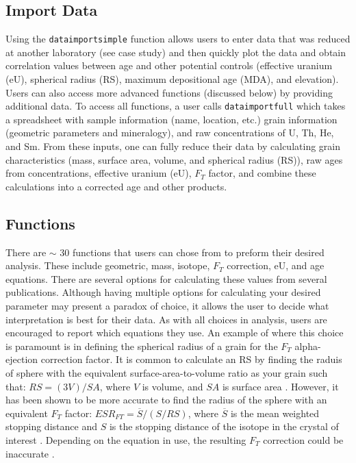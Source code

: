 \documentclass[12pt]{article}
\begin{document}
\subsection{Import Data}
Using the \texttt{dataimportsimple} function allows users to enter data that was reduced at another laboratory (see case study) and then quickly plot the data and obtain correlation values between age and other potential controls (effective uranium (eU), spherical radius (RS), maximum depositional age (MDA), and elevation). Users can also access more advanced functions (discussed below) by providing additional data. To access all functions, a user calls \texttt{dataimportfull} which takes a spreadsheet with sample information (name, location, etc.) grain information (geometric parameters and mineralogy), and raw concentrations of U, Th, He, and Sm. From these inputs, one can fully reduce their data by calculating grain characteristics (mass, surface area, volume, and spherical radius (RS)), raw ages from concentrations, effective uranium (eU), $F_T$ factor, and combine these calculations into a corrected age and other products. 

\subsection{Functions}
There are $\sim$ 30 functions that users can chose from to preform their desired analysis. These include geometric, mass, isotope, $F_T$ correction, eU, and age equations. There are several options for calculating these values from several publications. Although having multiple options for calculating your desired parameter may present a paradox of choice, it allows the user to decide what interpretation is best for their data. As with all choices in analysis, users are encouraged to report which equations they use. An example of where this choice is paramount is in defining the spherical radius of a grain for the $F_T$ alpha-ejection correction factor. It is common to calculate an RS by finding the raduis of sphere with the equivalent surface-area-to-volume ratio as your grain such that: $RS = (3V)/SA$, where $V$ is volume, and $SA$ is surface area \citep{farleyetal1996}. However, it has been shown to be more accurate to find the radius of the sphere with an equivalent $F_T$ factor: $ESR_{FT} = \overline{S}/(S/RS)$, where $\overline{S}$ is the mean weighted stopping distance and $S$ is the stopping distance of the isotope in the crystal  of interest \citep{cooperdocketal}. Depending on the equation in use, the resulting $F_T$ correction could be inaccurate \citep{ketchametal2011, cooperdocketal}.
\end{document}
